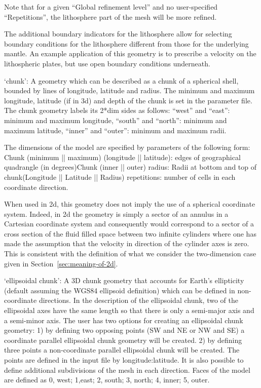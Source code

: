 \begin{itemize}
Note that for a given ``Global refinement level'' and no user-specified ``Repetitions'', the lithosphere part of the mesh will be more refined. 

The additional boundary indicators for the lithosphere allow for selecting boundary conditions for the lithosphere different from those for the underlying mantle. An example application of this geometry is to prescribe a velocity on the lithospheric plates, but use open boundary conditions underneath. 

`chunk': A geometry which can be described as a chunk of a spherical shell, bounded by lines of longitude, latitude and radius. The minimum and maximum longitude, latitude (if in 3d) and depth of the chunk is set in the parameter file. The chunk geometry labels its 2*dim sides as follows: ``west'' and ``east'': minimum and maximum longitude, ``south'' and ``north'': minimum and maximum latitude, ``inner'' and ``outer'': minimum and maximum radii. 

The dimensions of the model are specified by parameters of the following form: Chunk (minimum || maximum) (longitude || latitude): edges of geographical quadrangle (in degrees)Chunk (inner || outer) radius: Radii at bottom and top of chunk(Longitude || Latitude || Radius) repetitions: number of cells in each coordinate direction.

When used in 2d, this geometry does not imply the use of a spherical coordinate system. Indeed, in 2d the geometry is simply a sector of an annulus in a Cartesian coordinate system and consequently would correspond to a sector of a cross section of the fluid filled space between two infinite cylinders where one has made the assumption that the velocity in direction of the cylinder axes is zero. This is consistent with the definition of what we consider the two-dimension case given in Section~\ref{sec:meaning-of-2d}.

`ellipsoidal chunk': A 3D chunk geometry that accounts for Earth's ellipticity (default assuming the WGS84 ellipsoid definition) which can be defined in non-coordinate directions. In the description of the ellipsoidal chunk, two of the ellipsoidal axes have the same length so that there is only a semi-major axis and a semi-minor axis. The user has two options for creating an ellipsoidal chunk geometry: 1) by defining two opposing points (SW and NE or NW and SE) a coordinate parallel ellipsoidal chunk geometry will be created. 2) by defining three points a non-coordinate parallel ellipsoidal chunk will be created. The points are defined in the input file by longitude:latitude. It is also possible to define additional subdivisions of the mesh in each direction. Faces of the model are defined as 0, west; 1,east; 2, south; 3, north; 4, inner; 5, outer.


\end{itemize}
